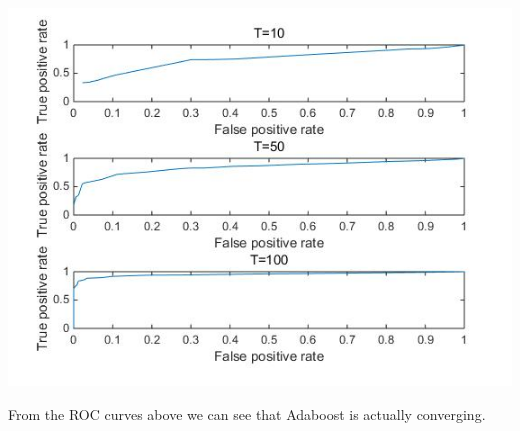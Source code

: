 \documentclass[12pt]{article}
\newenvironment{p2}[2][III Adaboost for Classifier Selection]{\begin{trivlist}
\item[\hskip \labelsep {\bfseries #1}\hskip \labelsep {\bfseries #2}]}{\end{trivlist}}
\begin{document}
\begin{p2}{}
\begin{center}
		\includegraphics[height=10cm]{data/roc.jpg}
\end{center}
From the ROC curves above we can see that Adaboost is actually converging.
\end{p2}{}
\end{document}
